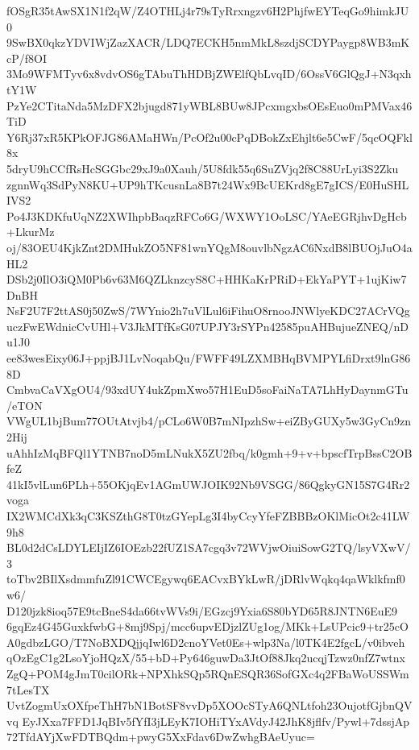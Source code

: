 fOSgR35tAwSX1N1f2qW/Z4OTHLj4r79sTyRrxngzv6H2PhjfwEYTeqGo9himkJU0
9SwBX0qkzYDVIWjZazXACR/LDQ7ECKH5nmMkL8szdjSCDYPaygp8WB3mKcP/f8OI
3Mo9WFMTyv6x8vdvOS6gTAbuThHDBjZWElfQbLvqID/6OssV6GlQgJ+N3qxhtY1W
PzYe2CTitaNda5MzDFX2bjugd871yWBL8BUw8JPcxmgxbsOEsEuo0mPMVax46TiD
Y6Rj37xR5KPkOFJG86AMaHWn/PcOf2u00cPqDBokZxEhjlt6e5CwF/5qcOQFkl8x
5dryU9hCCfRsHcSGGbc29xJ9a0Xauh/5U8fdk55q6SuZVjq2f8C88UrLyi3S2Zku
zgnnWq3SdPyN8KU+UP9hTKcusnLa8B7t24Wx9BcUEKrd8gE7gICS/E0HuSHLIVS2
Po4J3KDKfuUqNZ2XWIhpbBaqzRFCo6G/WXWY1OoLSC/YAeEGRjhvDgHcb+LkurMz
oj/83OEU4KjkZnt2DMHukZO5NF81wnYQgM8ouvlbNgzAC6NxdB8lBUOjJuO4aHL2
DSb2j0IlO3iQM0Pb6v63M6QZLknzcyS8C+HHKaKrPRiD+EkYaPYT+1ujKiw7DnBH
NsF2U7F2ttAS0j50ZwS/7WYnio2h7uVlLul6iFihuO8rnooJNWlyeKDC27ACrVQg
uczFwEWdnicCvUHl+V3JkMTfKsG07UPJY3rSYPn42585puAHBujueZNEQ/nDu1J0
ee83wesEixy06J+ppjBJ1LvNoqabQu/FWFF49LZXMBHqBVMPYLfiDrxt9lnG868D
CmbvaCaVXgOU4/93xdUY4ukZpmXwo57H1EuD5soFaiNaTA7LhHyDaynmGTu/eTON
VWgUL1bjBum77OUtAtvjb4/pCLo6W0B7mNIpzhSw+eiZByGUXy5w3GyCn9zn2Hij
uAhhIzMqBFQl1YTNB7noD5mLNukX5ZU2fbq/k0gmh+9+v+bpscfTrpBssC2OBfeZ
41kI5vlLun6PLh+55OKjqEv1AGmUWJOIK92Nb9VSGG/86QgkyGN15S7G4Rr2voga
IX2WMCdXk3qC3KSZthG8T0tzGYepLg3I4byCcyYfeFZBBBzOKlMicOt2c41LW9h8
BL0d2dCsLDYLEIjIZ6IOEzb22fUZ1SA7cgq3v72WVjwOiuiSowG2TQ/lsyVXwV/3
toTbv2BIlXsdmmfuZl91CWCEgywq6EACvxBYkLwR/jDRlvWqkq4qaWklkfmf0w6/
D120jzk8ioq57E9tcBneS4da66tvWVs9i/EGzcj9Yxia6S80bYD65R8JNTN6EuE9
6gqEz4G45GuxkfwbG+8mj9Spj/mcc6upvEDjzlZUg1og/MKk+LsUPcic9+tr25cO
A0gdbzLGO/T7NoBXDQjjqIwl6D2cnoYVet0Es+wlp3Na/l0TK4E2fgcL/v0ibveh
qOzEgC1g2LsoYjoHQzX/55+bD+Py646guwDa3JtOf88Jkq2ucqjTzwz0nfZ7wtnx
ZgQ+POM4gJmT0cilORk+NPXhkSQp5RQnESQR36SofGXc4q2FBaWoUSSWm7tLesTX
UvtZogmUxOXfpeThH7bN1BotSF8vvDp5XOOcSTyA6QNLtfoh23OujotfGjbnQVvq
EyJXxa7FFD1JqBIv5fYfI3jLEyK7IOHiTYxAVdyJ42JhK8jflfv/Pywl+7dssjAp
72TfdAYjXwFDTBQdm+pwyG5XxFdav6DwZwhgBAeUyuc=
